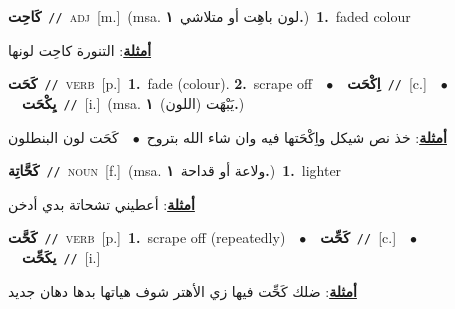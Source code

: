 \documentclass[10pt,a4paper,twoside]{article} %
\begin{document}
\begin{multicols}{2}
{\setlength\topsep{0pt}\textbf{\foreignlanguage{arabic}{كَاحِت}}\ {\color{gray}\texttt{//}\color{black}}\ \textsc{adj}\ [m.]\ \color{gray}(msa. \foreignlanguage{arabic}{لون باهِت أو متلاشي}~\foreignlanguage{arabic}{\textbf{١.}})\color{black}\ \textbf{1.}~faded colour\  \begin{flushright}\color{gray}\foreignlanguage{arabic}{\textbf{\underline{\foreignlanguage{arabic}{أمثلة}}}: التنورة كاحِت لونها}\end{flushright}\color{black}} \vspace{2mm}

{\setlength\topsep{0pt}\textbf{\foreignlanguage{arabic}{كَحَت}}\ {\color{gray}\texttt{//}\color{black}}\ \textsc{verb}\ [p.]\ \textbf{1.}~fade (colour).  \textbf{2.}~scrape off\ \ $\bullet$\ \ \setlength\topsep{0pt}\textbf{\foreignlanguage{arabic}{اِكْحَت}}\ {\color{gray}\texttt{//}\color{black}}\ [c.]\ \ $\bullet$\ \ \setlength\topsep{0pt}\textbf{\foreignlanguage{arabic}{يِكْحَت}}\ {\color{gray}\texttt{//}\color{black}}\ [i.]\ \color{gray}(msa. \foreignlanguage{arabic}{يَبْهَت (اللون)}~\foreignlanguage{arabic}{\textbf{١.}})\color{black}\  \begin{flushright}\color{gray}\foreignlanguage{arabic}{\textbf{\underline{\foreignlanguage{arabic}{أمثلة}}}: خذ نص شيكل واِكْحَتها فيه وان شاء الله بتروح\ $\bullet$\ \  كَحَت لون البنطلون}\end{flushright}\color{black}} \vspace{2mm}

{\setlength\topsep{0pt}\textbf{\foreignlanguage{arabic}{كَحَّاتِة}}\ {\color{gray}\texttt{//}\color{black}}\ \textsc{noun}\ [f.]\ \color{gray}(msa. \foreignlanguage{arabic}{ولاعة أو قداحة}~\foreignlanguage{arabic}{\textbf{١.}})\color{black}\ \textbf{1.}~lighter\  \begin{flushright}\color{gray}\foreignlanguage{arabic}{\textbf{\underline{\foreignlanguage{arabic}{أمثلة}}}: أعطيني تشحاتة بدي أدخن}\end{flushright}\color{black}} \vspace{2mm}

{\setlength\topsep{0pt}\textbf{\foreignlanguage{arabic}{كَحَّت}}\ {\color{gray}\texttt{//}\color{black}}\ \textsc{verb}\ [p.]\ \textbf{1.}~scrape off (repeatedly)\ \ $\bullet$\ \ \setlength\topsep{0pt}\textbf{\foreignlanguage{arabic}{كَحِّت}}\ {\color{gray}\texttt{//}\color{black}}\ [c.]\ \ $\bullet$\ \ \setlength\topsep{0pt}\textbf{\foreignlanguage{arabic}{يكَحِّت}}\ {\color{gray}\texttt{//}\color{black}}\ [i.]\  \begin{flushright}\color{gray}\foreignlanguage{arabic}{\textbf{\underline{\foreignlanguage{arabic}{أمثلة}}}: ضلك كَحِّت فيها زي الأهتر شوف هياتها بدها دهان جديد}\end{flushright}\color{black}} \vspace{2mm}


\end{multicols}
\end{document}
